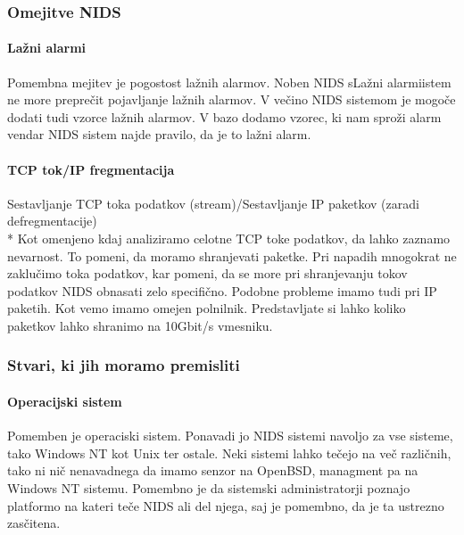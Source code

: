 \documentclass[12pt]{article}
\begin{document}

\subsubsection{Omejitve NIDS} %

\paragraph{Lažni alarmi} %
Pomembna mejitev je pogostost lažnih alarmov.
Noben NIDS sLažni alarmiistem ne more preprečit pojavljanje lažnih alarmov.
V večino NIDS sistemom je mogoče dodati tudi vzorce lažnih alarmov. 
V bazo dodamo vzorec, ki nam sproži alarm vendar NIDS sistem najde pravilo, da je to lažni alarm.

\paragraph{TCP tok/IP fregmentacija} %

Sestavljanje TCP toka podatkov (stream)/Sestavljanje IP paketkov (zaradi defregmentacije)
\\*
Kot omenjeno kdaj analiziramo celotne TCP toke podatkov, da lahko zaznamo nevarnost. To pomeni, da moramo shranjevati paketke. 
Pri napadih mnogokrat ne zaklučimo toka podatkov, kar pomeni, da se more pri shranjevanju tokov podatkov NIDS obnasati zelo specifično. Podobne probleme imamo tudi pri IP paketih. 
Kot vemo imamo omejen polnilnik. Predstavljate si lahko koliko paketkov lahko shranimo na 10Gbit/s vmesniku.


\subsubsection{Stvari, ki jih moramo premisliti} %

\paragraph{Operacijski sistem} %

Pomemben je operaciski sistem. Ponavadi jo NIDS sistemi navoljo za vse sisteme,
tako Windows NT kot Unix ter ostale. Neki sistemi lahko tečejo na več različnih, tako ni nič nenavadnega
da imamo senzor na OpenBSD, managment pa na Windows NT sistemu.
Pomembno je da sistemski administratorji poznajo platformo na kateri teče NIDS ali del njega, saj je pomembno, da je ta ustrezno zasčitena.
\end{document}
